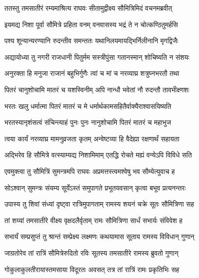 
\twolineshloka
{ततस्तु तमसातीरं रम्यमाश्रित्य राघवः}
{सीतामुद्वीक्ष्य सौमित्रिमिदं वचनमब्रवीत्} %

\twolineshloka
{इयमद्य निशा पूर्वा सौमित्रे प्रहिता वनम्}
{वनवासस्य भद्रं ते न चोत्कण्ठितुमर्हसि} %

\twolineshloka
{पश्य शून्यान्यरण्यानि रुदन्तीव समन्ततः}
{यथानिलयमायद्भिर्निलीनानि मृगद्विजैः} %

\twolineshloka
{अद्यायोध्या तु नगरी राजधानी पितुर्मम}
{सस्त्रीपुंसा गतानस्मान् शोचिष्यति न संशयः} %

\twolineshloka
{अनुरक्ता हि मनुजा राजानं बहुभिर्गुणैः}
{त्वां च मां च नरव्याघ्र शत्रुघ्नभरतौ तथा} %

\twolineshloka
{पितरं चानुशोचामि मातरं च यशस्विनीम्}
{अपि नान्धौ भवेतां नौ रुदन्तौ तावभीक्ष्णशः} %

\twolineshloka
{भरतः खलु धर्मात्मा पितरं मातरं च मे}
{धर्मार्थकामसहितैर्वाक्यैराश्वासयिष्यति} %

\twolineshloka
{भरतस्यानृशंसत्वं संचिन्त्याहं पुनः पुनः}
{नानुशोचामि पितरं मातरं च महाभुज} %

\twolineshloka
{त्वया कार्यं नरव्याघ्र मामनुव्रजता कृतम्}
{अन्वेष्टव्या हि वैदेह्या रक्षणार्थं सहायता} %

\twolineshloka
{अद्भिरेव हि सौमित्रे वत्स्याम्यद्य निशामिमाम्}
{एतद्धि रोचते मह्यं वन्येऽपि विविधे सति} %

\twolineshloka
{एवमुक्त्वा तु सौमित्रिं सुमन्त्रमपि राघवः}
{अप्रमत्तस्त्वमश्वेषु भव सौम्येत्युवाच ह} %

\twolineshloka
{सोऽश्वान् सुमन्त्रः संयम्य सूर्येऽस्तं समुपागते}
{प्रभूतयवसान् कृत्वा बभूव प्रत्यनन्तरः} %

\twolineshloka
{उपास्य तु शिवां संध्यां दृष्ट्वा रात्रिमुपागताम्}
{रामस्य शयनं चक्रे सूतः सौमित्रिणा सह} %

\twolineshloka
{तां शय्यां तमसातीरे वीक्ष्य वृक्षदलैर्वृताम्}
{रामः सौमित्रिणा सार्धं सभार्यः संविवेश ह} %

\twolineshloka
{सभार्यं सम्प्रसुप्तं तु श्रान्तं सम्प्रेक्ष्य लक्ष्मणः}
{कथयामास सूताय रामस्य विविधान् गुणान्} %

\twolineshloka
{जाग्रतोरेव तां रात्रिं सौमित्रेरुदितो रविः}
{सूतस्य तमसातीरे रामस्य ब्रुवतो गुणान्} %

\twolineshloka
{गोकुलाकुलतीरायास्तमसाया विदूरतः}
{अवसत् तत्र तां रात्रिं रामः प्रकृतिभिः सह} %

